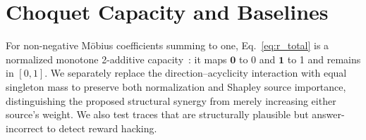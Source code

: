 
\section{Choquet Capacity and Baselines}
\label{app:choquet}
For non-negative M\"obius coefficients summing to one, Eq.~\ref{eq:r_total} is a normalized monotone 2-additive capacity~\citep{choquet1954capacities,grabisch1997kadditive}: it maps $\mathbf{0}$ to 0 and $\mathbf{1}$ to 1 and remains in $[0,1]$. We separately replace the direction--acyclicity interaction with equal singleton mass to preserve both normalization and Shapley source importance, distinguishing the proposed structural synergy from merely increasing either source's weight. We also test traces that are structurally plausible but answer-incorrect to detect reward hacking.

